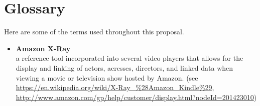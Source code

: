 %
\pagestyle{empty}
\hfill
{}
\section*{Glossary}


Here are some of the terms used throughout this proposal.

\begin{itemize}[leftmargin=*]
\label{glossary:amazon-x-ray}
\item \textbf{Amazon X-Ray} \\
	a reference tool incorporated into several video players that allows for the display and linking of actors, acresses, directors, and linked data when viewing a movie or television show hosted by Amazon. (see \url{https://en.wikipedia.org/wiki/X-Ray_%28Amazon_Kindle%29}, \url{http://www.amazon.com/gp/help/customer/display.html?nodeId=201423010})


\end{itemize}

